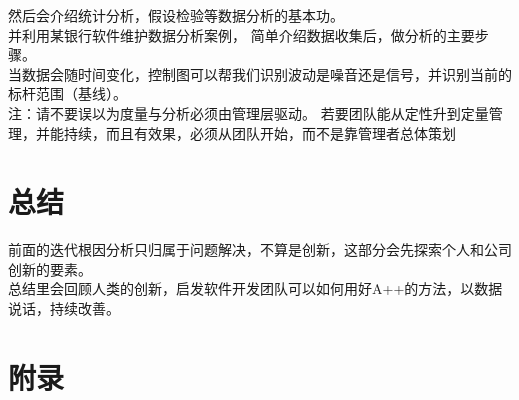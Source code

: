 \documentclass{book}        %
\begin{document}
然后会介绍统计分析，假设检验等数据分析的基本功。\\

并利用某银行软件维护数据分析案例， 简单介绍数据收集后，做分析的主要步骤。\\

当数据会随时间变化，控制图可以帮我们识别波动是噪音还是信号，并识别当前的标杆范围（基线）。\\

注：请不要误以为度量与分析必须由管理层驱动。 若要团队能从定性升到定量管理，并能持续，而且有效果，必须从团队开始，而不是靠管理者总体策划 \\










\part{总结} 前面的迭代根因分析只归属于问题解决，不算是创新，这部分会先探索个人和公司创新的要素。\\
总结里会回顾人类的创新，启发软件开发团队可以如何用好A++的方法，以数据说话，持续改善。\\







\part{附录}



%
\end{document}
